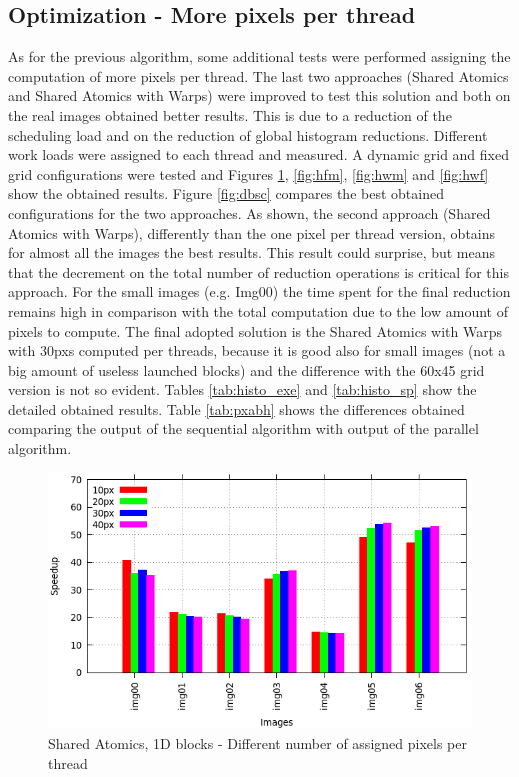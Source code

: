 \documentclass[a4paper]{article}
\begin{document}
\subsection{Optimization - More pixels per thread}
\label{sec:hop}
As for the previous algorithm, some additional tests were performed assigning the computation of more pixels per thread. The last two approaches (Shared Atomics and Shared Atomics with Warps) were improved to test this solution and both on the real images obtained better results. This is due to a reduction of the scheduling load and on the reduction of global histogram reductions. Different work loads were assigned to each thread and measured. A dynamic grid and fixed grid configurations were tested and Figures \ref{fig:hum}, \ref{fig:hfm}, \ref{fig:hwm} and \ref{fig:hwf} show the obtained results. Figure \ref{fig:dbsc} compares the best obtained configurations for the two approaches. As shown, the second approach (Shared Atomics with Warps), differently than the one pixel per thread version, obtains for almost all the images the best results. This result could surprise, but means that the decrement on the total number of reduction operations is critical for this approach. For the small images (e.g. Img00) the time spent for the final reduction remains high in comparison with the total computation due to the low amount of pixels to compute. The final adopted solution is the Shared Atomics with Warps with 30pxs computed per threads, because it is good also for small images (not a big amount of useless launched blocks) and the difference with the 60x45 grid version is not so evident. Tables \ref{tab:histo_exe} and \ref{tab:histo_sp} show the detailed obtained results. Table \ref{tab:pxabh} shows the differences obtained comparing the output of the sequential algorithm with output of the parallel algorithm.


\begin{figure}[!ht]
    \centering
    \includegraphics[width=0.65\linewidth]{res/new/histogram_uni_more}
    \caption{Shared Atomics, 1D blocks - Different number of assigned pixels per thread}
    \label{fig:hum}
\end{figure}
\FloatBarrier
\end{document}
